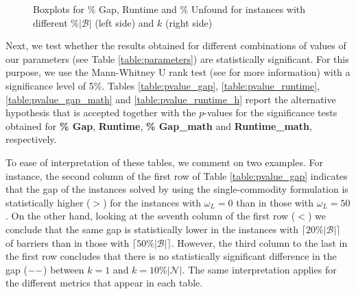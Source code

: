 \documentclass[a4paper,  review, authoryear, 1p.]{elsarticle}
\newcommand{\JP}[1]{{\color{blue}#1}}
\begin{document}
		\begin{figure}[h!]
			\centering
			\caption{Boxplots for \% Gap, Runtime and \% Unfound for instances with different $\%|\mathcal B|$ (left side) and $k$ (right side)}

			
			\label{fig:results_percentage}
					
		\end{figure}

		\JP{
		
		Next, we test whether the results obtained for different combinations of values of our parameters (see Table \ref{table:parameters}) are statistically significant. For this purpose, we use the Mann-Whitney U rank test (see \cite{mcknight2010} for more information) with a significance level of 5\%. Tables \ref{table:pvalue_gap}, \ref{table:pvalue_runtime}, \ref{table:pvalue_gap_math} and \ref{table:pvalue_runtime_h} report the alternative hypothesis that is accepted together with the $p$-values for the significance tests obtained for \textbf{\% Gap}, \textbf{Runtime}, \textbf{\% Gap\_{math}} and \textbf{Runtime\_{math}}, respectively.

		To ease of interpretation of these tables, we comment on two examples. For instance, the second column of the first row of Table \ref{table:pvalue_gap} indicates that 
 the gap of the instances solved by using the single-commodity formulation is statistically higher ($>$) for the instances with $\omega_L=0$ than in those with $\omega_L=50$. On the other hand, looking at the seventh column of the first row ($<$) we conclude that the same gap is statistically lower in the instances with $\lceil 20 \%|\mathcal B|\rceil$ of barriers than in those with $\lceil 50 \%|\mathcal B|\rceil$. However, the third column to the last in the first row concludes that there is no statistically significant difference in the gap ($\---$) between $k=1$ and $k=10\%|\mathcal N|$. The same interpretation applies for the different metrics that appear in each table.
 		
}
\end{document}
